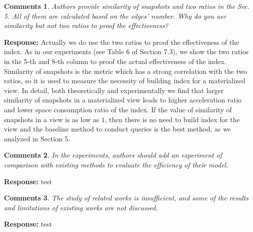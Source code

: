 \documentclass{article}
\newtheorem{Comments}{\textbf{Comments}}
\begin{document}
\begin{Comments}
Authors provide similarity of snapshots and two ratios in the Sec. 5. All of them are calculated based on the edges’ number. Why do you use similarity but not two ratios to proof the effectiveness?
\end{Comments}
\noindent \textbf{Response:} Actually we do use the two ratios to proof the effectiveness of the index. As in our experiments (see Table 6 of Section 7.3), we show the two ratios in the 5-th and 8-th column to proof the actual effectiveness of the index. Similarity of snapshots is the metric which has a strong correlation with the two ratios, so it is used to measure the necessity of building index for a materialized view. In detail, both theoretically and experimentally we find that larger similarity of snapshots in a materialized view leads to higher acceleration ratio and lower space consumption ratio of the index. If the value of similarity of snapshots in a view is as low as $ 1 $, then there is no need to build index for the view and the baseline method to conduct queries is the best method, as we analyzed in Section 5.

\begin{Comments}
In the experiments, authors should add an experiment of comparison with existing methods to evaluate the efficiency of their model.
\end{Comments}
\noindent \textbf{Response:} test

\begin{Comments}
The study of related works is insufficient, and some of the results and limitations of existing works are not discussed.
\end{Comments}
\noindent \textbf{Response:} test
\end{document}
